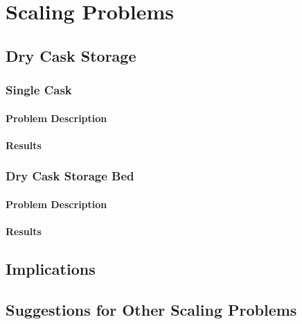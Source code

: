 \chapter{Scaling Problems}

\section{Dry Cask Storage}
\subsection{Single Cask}
\subsubsection{Problem Description}
\subsubsection{Results}
\subsection{Dry Cask Storage Bed}
\subsubsection{Problem Description}
\subsubsection{Results}
\section{Implications}
\section{Suggestions for Other Scaling Problems}

